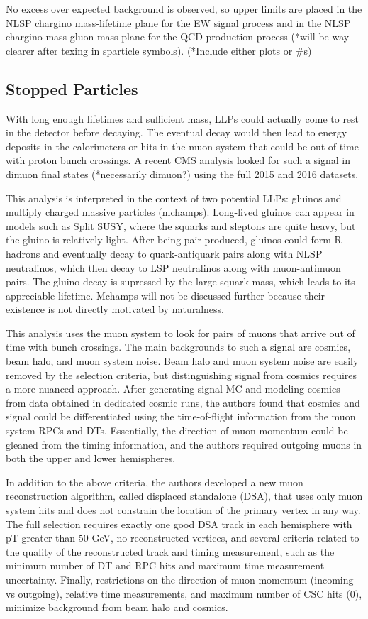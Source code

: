 \documentclass[12pt]{article}
\begin{document}
            No excess over expected background is observed, so upper limits are placed in the NLSP chargino mass-lifetime plane for the EW signal process and in the NLSP chargino mass gluon mass plane for the QCD production process (*will be way clearer after texing in sparticle symbols). (*Include either plots or \#s)

\subsection{Stopped Particles}
            With long enough lifetimes and sufficient mass, LLPs could actually come to rest in the detector before decaying. The eventual decay would then lead to energy deposits in the calorimeters or hits in the muon system that could be out of time with proton bunch crossings. A recent CMS analysis looked for such a signal in dimuon final states (*necessarily dimuon?) using the full 2015 and 2016 datasets. 

            This analysis is interpreted in the context of two potential LLPs: gluinos and multiply charged massive particles (mchamps). Long-lived gluinos can appear in models such as Split SUSY, where the squarks and sleptons are quite heavy, but the gluino is relatively light. After being pair produced, gluinos could form R-hadrons and eventually decay to quark-antiquark pairs along with NLSP neutralinos, which then decay to LSP neutralinos along with muon-antimuon pairs. The gluino decay is supressed by the large squark mass, which leads to its appreciable lifetime. Mchamps will not be discussed further because their existence is not directly motivated by naturalness.

            This analysis uses the muon system to look for pairs of muons that arrive out of time with bunch crossings. The main backgrounds to such a signal are cosmics, beam halo, and muon system noise. Beam halo and muon system noise are easily removed by the selection criteria, but distinguishing signal from cosmics requires a more nuanced approach. After generating signal MC and modeling cosmics from data obtained in dedicated cosmic runs, the authors found that cosmics and signal could be differentiated using the time-of-flight information from the muon system RPCs and DTs. Essentially, the direction of muon momentum could be gleaned from the timing information, and the authors required outgoing muons in both the upper and lower hemispheres.
            
            In addition to the above criteria, the authors developed a new muon reconstruction algorithm, called displaced standalone (DSA), that uses only muon system hits and does not constrain the location of the primary vertex in any way. The full selection requires exactly one good DSA track in each hemisphere with pT greater than 50 GeV, no reconstructed vertices, and several criteria related to the quality of the reconstructed track and timing measurement, such as the minimum number of DT and RPC hits and maximum time measurement uncertainty. Finally, restrictions on the direction of muon momentum (incoming vs outgoing), relative time measurements, and maximum number of CSC hits (0), minimize background from beam halo and cosmics.
\end{document}
